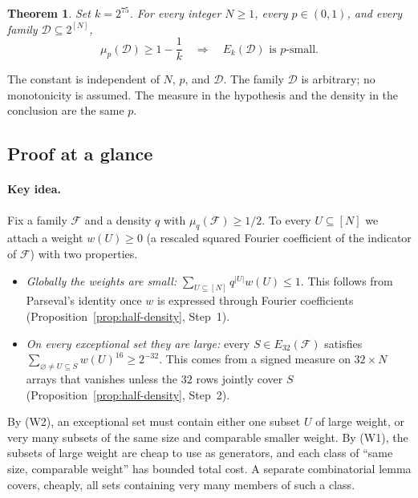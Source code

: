 \documentclass[11pt,letterpaper]{article}
\newtheorem{theorem}{Theorem}[section]
\theoremstyle{definition}
\theoremstyle{remark}
\numberwithin{equation}{section}
\begin{document}
\begin{theorem}
\label{thm:main}
Set $k=2^{75}$. For every integer $N\ge1$, every $p\in(0,1)$, and every
family $\mathcal D\subseteq2^{[N]}$,
\[
\mu_p(\mathcal D)\ge1-\frac1k
\quad\Longrightarrow\quad
E_k(\mathcal D)\text{ is }p\text{-small}.
\]
\end{theorem}

The constant is independent of $N$, $p$, and $\mathcal D$.
The family $\mathcal D$ is arbitrary; no monotonicity is assumed.
The measure in the hypothesis and the density in the conclusion are the
same $p$.

\subsection{Proof at a glance}
\label{sec:glance}

\paragraph{Key idea.}
Fix a family $\mathcal F$ and a density $q$ with $\mu_q(\mathcal F)\ge1/2$.
To every $U\subseteq[N]$ we attach a weight $w(U)\ge0$ (a rescaled squared
Fourier coefficient of the indicator of $\mathcal F$) with two properties.
\begin{itemize}
\item[(W1)] \emph{Globally the weights are small:}
$\sum_{U\subseteq[N]}q^{|U|}w(U)\le1$. This follows from Parseval's
identity once $w$ is expressed through Fourier coefficients
(Proposition~\ref{prop:half-density}, Step~1).
\item[(W2)] \emph{On every exceptional set they are large:}
every $S\in E_{32}(\mathcal F)$ satisfies
$\sum_{\varnothing\ne U\subseteq S}w(U)^{16}\ge2^{-32}$. This comes from a
signed measure on $32\times N$ arrays that vanishes unless the $32$ rows
jointly cover $S$ (Proposition~\ref{prop:half-density}, Step~2).
\end{itemize}
By (W2), an exceptional set must contain either one subset $U$ of large
weight, or very many subsets of the same size and comparable smaller
weight. By (W1), the subsets of large weight are cheap to use as
generators, and each class of ``same size, comparable weight'' has bounded
total cost. A separate combinatorial lemma covers, cheaply, all sets
containing very many members of such a class.
\end{document}
